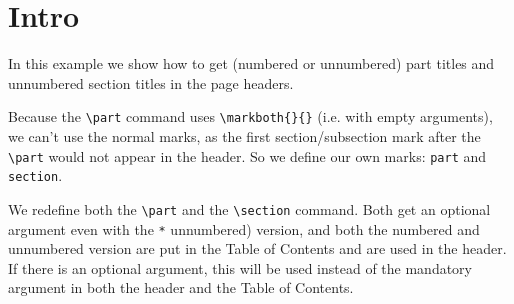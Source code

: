 \documentclass{article}
\begin{document}
\tableofcontents

\part*{Intro}

\noindent
\begin{boxedminipage}{\textwidth}
In this example we show how to get (numbered or unnumbered) part titles and unnumbered section titles in the page headers.

Because the \verb|\part| command uses \verb|\markboth{}{}| (i.e. with empty arguments), we can't use the normal marks, as the first section/subsection mark after the \verb|\part| would not appear in the header.
So we define our own marks: \texttt{part} and \texttt{section}.

We redefine both the \verb|\part| and the \verb|\section| command. Both get an optional argument even with the \texttt{*} unnumbered) version, and both the numbered and unnumbered version are put in the Table of Contents and are used in the header. If there is an optional argument, this will be used instead of the mandatory argument in both the header and the Table of Contents.
\end{boxedminipage}
\end{document}
